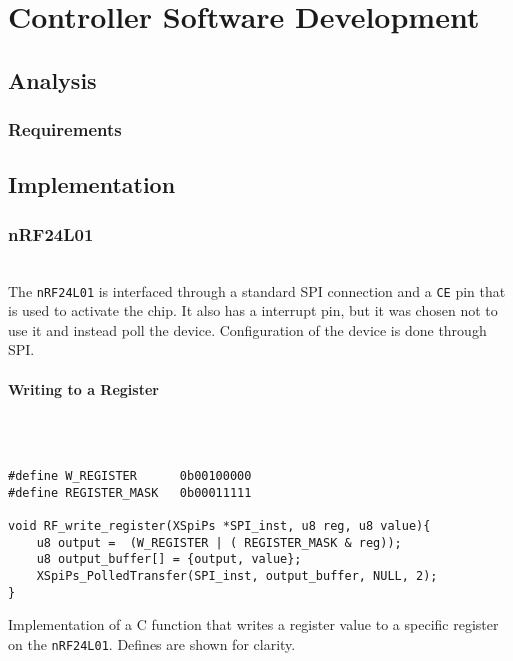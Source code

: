 \section{Controller Software Development} %
\label{sub:controller_board_software}

\subsection{Analysis} %
\label{sub:analysis}

\subsubsection{Requirements} %
\label{ssub:controller_requirements}

\subsection{Implementation} %
\label{sub:implementation}

\subsubsection{nRF24L01} %
\label{subs:nrf24l01}
~\\
The \texttt{nRF24L01} is interfaced through a standard SPI connection and a \texttt{CE} pin that is used to activate the chip. 
It also has a interrupt pin, but it was chosen not to use it and instead poll the device. 
Configuration of the device is done through SPI.

\paragraph{Writing to a Register} %
\label{par:writing_to_a_register}
~\\

\begin{listing}[h]
\begin{verbatim}

#define W_REGISTER      0b00100000
#define REGISTER_MASK   0b00011111

void RF_write_register(XSpiPs *SPI_inst, u8 reg, u8 value){
	u8 output =  (W_REGISTER | ( REGISTER_MASK & reg));
	u8 output_buffer[] = {output, value};
	XSpiPs_PolledTransfer(SPI_inst, output_buffer, NULL, 2);
}
\end{verbatim}
\caption{Implementation of a C function that writes a register value to a specific register on the \texttt{nRF24L01}. Defines are shown for clarity.}
\label{code:rf_write_register}
\end{listing}

